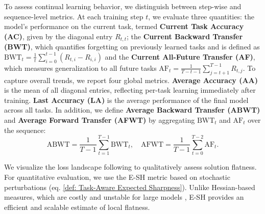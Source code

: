 \documentclass[letterpaper]{article} %
\begin{document}
To assess continual learning behavior, we distinguish between step-wise and sequence-level metrics. At each training step $t$, we evaluate three quantities: the model’s performance on the current task, termed \textbf{Current Task Accuracy (AC)}, given by the diagonal entry $R_{t,t}$; the \textbf{Current Backward Transfer (BWT)}, which quantifies forgetting on previously learned tasks and is defined as $\mathrm{BWT}_t = \frac{1}{t} \sum_{i=0}^{t-1} (R_{t,i} - R_{i,i})$ and the \textbf{Current All-Future Transfer (AF)}, which measures generalization to all future tasks $\mathrm{AF}_t = \frac{1}{T - t - 1} \sum_{j = t+1}^{T-1} R_{t,j}.$ To capture overall trends, we report four global metrics. \textbf{Average Accuracy (AA)} is the mean of all diagonal entries, reflecting per-task learning immediately after training. \textbf{Last Accuracy (LA)} is the average performance of the final model across all tasks. In addition, we define \textbf{Average Backward Transfer (ABWT)} and \textbf{Average Forward Transfer (AFWT)} by aggregating $\mathrm{BWT}_t$ and $\mathrm{AF}_t$ over the sequence:
\[
\mathrm{ABWT} = \frac{1}{T - 1} \sum_{t = 1}^{T-1} \mathrm{BWT}_t, \quad 
\mathrm{AFWT} = \frac{1}{T - 1} \sum_{t = 0}^{T-2} \mathrm{AF}_t.
\]






We visualize the loss landscape following \cite{liVisualizingLossLandscape2018} to qualitatively assess solution flatness. For quantitative evaluation, we use the E-SH metric based on stochastic perturbations (eq. \ref{def: Task-Aware Expected Sharpness}). Unlike Hessian-based measures, which are costly and unstable for large models \cite{pmlr-v70-dinh17b}, E-SH provides an efficient and scalable estimate of local flatness.

\end{document}
